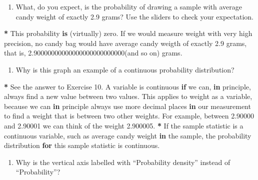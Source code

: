 \documentclass[a4paper]{book}
\newenvironment{Shaded}{\begin{snugshade}}{\end{snugshade}}
\newcommand{\KeywordTok}[1]{\textcolor[rgb]{0,0,0}{\textbf{#1}}}
\newcommand{\DecValTok}[1]{\textcolor[rgb]{0.00,0.00,0.00}{#1}}
\newcommand{\FloatTok}[1]{\textcolor[rgb]{0.00,0.00,0.00}{#1}}
\newcommand{\StringTok}[1]{\textcolor[rgb]{0.00,0.00,0.00}{#1}}
\newcommand{\ControlFlowTok}[1]{\textcolor[rgb]{0.00,0.00,0.00}{\textbf{#1}}}
\newcommand{\OperatorTok}[1]{\textcolor[rgb]{0.00,0.00,0.00}{\textbf{#1}}}
\newcommand{\NormalTok}[1]{#1}
\providecommand{\tightlist}{%
  \setlength{\itemsep}{0pt}\setlength{\parskip}{0pt}}
\theoremstyle{definition}
\theoremstyle{definition}
\theoremstyle{definition}
\theoremstyle{remark}
\begin{document}
\begin{enumerate}
\def\labelenumi{\arabic{enumi}.}
\setcounter{enumi}{9}
\tightlist
\item
  What, do you expect, is the probability of drawing a sample with
  average candy weight of exactly 2.9 grams? Use the sliders to check
  your expectation.
\end{enumerate}

\begin{Shaded}
\begin{Highlighting}[]
\OperatorTok{*}\StringTok{ }\NormalTok{This probability }\KeywordTok{is}\NormalTok{ (virtually) zero. If we would measure weight with very}
\NormalTok{high precision, no candy bag would have average candy weigth of exactly }\FloatTok{2.9}
\NormalTok{grams, that is, }\FloatTok{2.90000000000000000000000000}\NormalTok{(and so on) grams.}
\end{Highlighting}
\end{Shaded}

\begin{enumerate}
\def\labelenumi{\arabic{enumi}.}
\setcounter{enumi}{10}
\tightlist
\item
  Why is this graph an example of a continuous probability distribution?
\end{enumerate}

\begin{Shaded}
\begin{Highlighting}[]
\OperatorTok{*}\StringTok{ }\NormalTok{See the answer to Exercise }\DecValTok{10}\NormalTok{. A variable is continuous }\ControlFlowTok{if}\NormalTok{ we can, }\ControlFlowTok{in}
\NormalTok{principle, always find a new value between two values. This applies to weight}
\NormalTok{as a variable, because we can }\ControlFlowTok{in}\NormalTok{ principle always use more decimal places }\ControlFlowTok{in}
\NormalTok{our measurement to find a weight that is between two other weights. For}
\NormalTok{example, between }\FloatTok{2.90000}\NormalTok{ and }\FloatTok{2.90001}\NormalTok{ we can think of the weight }\FloatTok{2.900005}\NormalTok{.}
\OperatorTok{*}\StringTok{ }\NormalTok{If the sample statistic is a continuous variable, such as average candy}
\NormalTok{weight }\ControlFlowTok{in}\NormalTok{ the sample, the probability distribution }\ControlFlowTok{for}\NormalTok{ this sample statistic}
\NormalTok{is continuous.}
\end{Highlighting}
\end{Shaded}

\begin{enumerate}
\def\labelenumi{\arabic{enumi}.}
\setcounter{enumi}{11}
\tightlist
\item
  Why is the vertical axis labelled with ``Probability density'' instead
  of ``Probability''?
\end{enumerate}
\end{document}
